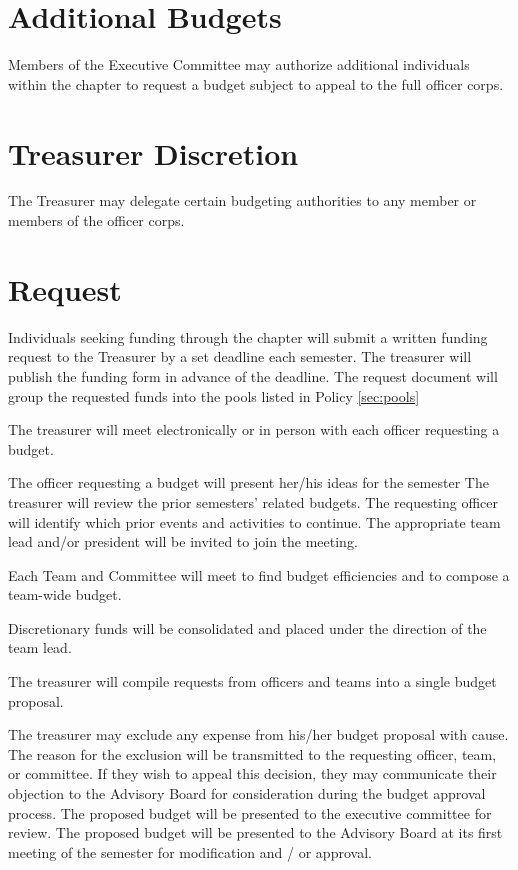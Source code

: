 \documentclass[bylaws,final,10pt,withoutoptional,withoutpreface,officerdoc]{../bylaws}
\begin{document}
\section{Additional Budgets} Members of the Executive Committee may  authorize additional individuals within the chapter to request a budget subject to appeal to the full officer corps.
\section{Treasurer Discretion} The Treasurer may delegate certain budgeting authorities to any member or members of the officer corps.

\section{Request} Individuals seeking funding through the chapter will submit a written funding request to the Treasurer by a set deadline each semester. The treasurer will publish the funding form in advance of the deadline. The request document will group the requested funds into the pools listed in Policy \ref{sec:pools}

\begin{enumsubsection}
\itemnotoc The treasurer will meet electronically or in person with each officer requesting a budget.  
 \begin{enumsubsubsection}
   \itemnotoc The officer requesting a budget will present her/his ideas for the semester
   \itemnotoc The treasurer will review the prior semesters' related budgets. The requesting officer will identify which prior events and activities to continue.
    \itemnotoc The appropriate team lead and/or president will be invited to join the meeting.
 \end{enumsubsubsection}
\itemnotoc Each Team and Committee will meet to find budget efficiencies and to compose a team-wide budget.
 \begin{enumsubsubsection}
 	\itemnotoc Discretionary funds will be consolidated and placed under the direction of the team lead.
\end{enumsubsubsection}
\itemnotoc The treasurer will compile requests from officers and teams into a single budget proposal. 
 \begin{enumsubsubsection}
 	\itemnotoc The treasurer may exclude any  expense from his/her budget proposal with cause. The reason for the exclusion will be transmitted to the requesting officer, team, or committee. If they wish to appeal this decision, they may communicate their objection to the Advisory Board for consideration during the budget approval process.
	\itemnotoc The proposed budget will be presented to the executive committee for review.
	\itemnotoc The proposed budget will be presented to the Advisory Board at its first meeting of the semester for modification and / or approval.
\end{enumsubsubsection}

\end{enumsubsection}
\end{document}
